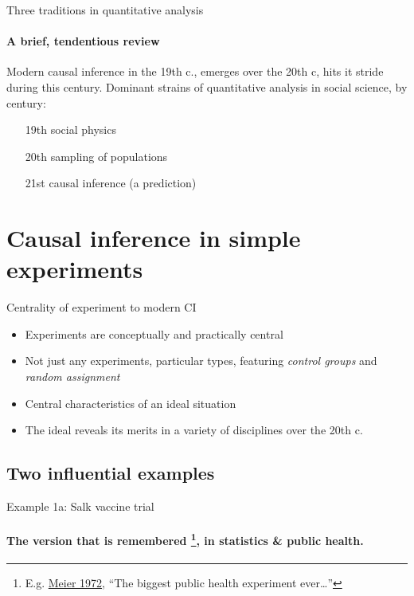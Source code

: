 
\begin{frame}{Three traditions in quantitative analysis}
\framesubtitle{A brief, tendentious review}

Modern causal inference in the 19th c., emerges over the 20th c, hits
it stride during this century. Dominant strains of quantitative
analysis in social science, by century:

\begin{itemize}
\item[19th] social physics
\item[20th] sampling of populations
\item[21st] causal inference (a prediction)
\end{itemize}

  
\end{frame}

\section{Causal inference in simple experiments}

\begin{frame}{Centrality of experiment to modern CI}
  \begin{itemize}
  \item Experiments are conceptually and practically central
  \item Not just any experiments, particular types, featuring
    \textit{control groups} and \textit{random assignment}
  \item Central characteristics of an ideal situation
  \item The ideal reveals its merits in a variety of disciplines over
    the 20th c.  
  \end{itemize}
\end{frame}

\subsection{Two influential examples}
\begin{frame}{Example 1a: Salk vaccine trial}
\framesubtitle{
   The version that is remembered \footnote{E.g.
      \href{http://www.cengage.com/resource_uploads/downloads/0534094929_46500.pdf}{Meier
        1972}, ``The biggest public health experiment ever\ldots''}, in statistics \& public health. }



\end{frame}

